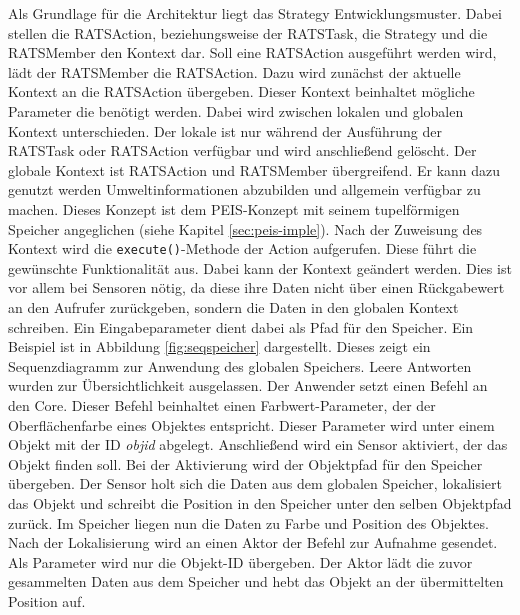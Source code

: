 Als Grundlage für die Architektur liegt das Strategy Entwicklungsmuster. Dabei stellen die RATSAction, beziehungsweise der RATSTask, die Strategy und die RATSMember den Kontext dar. Soll eine RATSAction ausgeführt werden wird, lädt der RATSMember die RATSAction. Dazu wird zunächst der aktuelle Kontext an die RATSAction übergeben. Dieser Kontext beinhaltet mögliche Parameter die benötigt werden. Dabei wird zwischen lokalen und globalen Kontext unterschieden. Der lokale ist nur während der Ausführung der RATSTask oder RATSAction verfügbar und wird anschließend gelöscht. Der globale Kontext ist RATSAction und RATSMember übergreifend. Er kann dazu genutzt werden Umweltinformationen abzubilden und allgemein verfügbar zu machen. Dieses Konzept ist dem PEIS-Konzept mit seinem tupelförmigen Speicher angeglichen (siehe Kapitel \ref{sec:peis-imple}). Nach der Zuweisung des Kontext wird die \lstinline|execute()|-Methode der Action aufgerufen. Diese führt die gewünschte Funktionalität aus. Dabei kann der Kontext geändert werden. Dies ist vor allem bei Sensoren nötig, da diese ihre Daten nicht über einen Rückgabewert an den Aufrufer zurückgeben, sondern die Daten in den globalen Kontext schreiben. Ein Eingabeparameter dient dabei als Pfad für den Speicher. Ein Beispiel ist in Abbildung \ref{fig:seqspeicher} dargestellt. Dieses zeigt ein Sequenzdiagramm zur Anwendung des globalen Speichers. Leere Antworten wurden zur Übersichtlichkeit ausgelassen. Der Anwender setzt einen Befehl an den Core. Dieser Befehl beinhaltet einen Farbwert-Parameter, der der Oberflächenfarbe eines Objektes entspricht. Dieser Parameter wird unter einem Objekt mit der ID \textit{objid} abgelegt. Anschließend wird ein Sensor aktiviert, der das Objekt finden soll. Bei der Aktivierung wird der Objektpfad für den Speicher übergeben. Der Sensor holt sich die Daten aus dem globalen Speicher, lokalisiert das Objekt und schreibt die Position in den Speicher unter den selben Objektpfad zurück. Im Speicher liegen nun die Daten zu Farbe und Position des Objektes. Nach der Lokalisierung wird an einen Aktor der Befehl zur Aufnahme gesendet. Als Parameter wird nur die Objekt-ID übergeben. Der Aktor lädt die zuvor gesammelten Daten aus dem Speicher und hebt das Objekt an der übermittelten Position auf.


